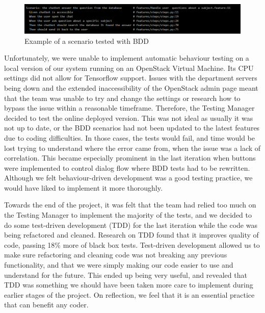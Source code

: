 \documentclass{l3proj}
\begin{document}
\begin{figure}[h!]
  \includegraphics[width=\linewidth]{figures/BDD.PNG}
  \caption{Example of a scenario tested with BDD}
\end{figure}

Unfortunately, we were unable to implement automatic behaviour testing on a local version of our system running on an OpenStack Virtual Machine. Its CPU settings did not allow for Tensorflow support. Issues with the department servers being down and the extended inaccessibility of the OpenStack admin page meant that the team was unable to try and change the settings or research how to bypass the issue within a reasonable timeframe. Therefore, the Testing Manager decided to test the online deployed version. This was not ideal as usually it was not up to date, or the BDD scenarios had not been updated to the latest features due to coding difficulties. In those cases, the tests would fail, and time would be lost trying to understand where the error came from, when the issue was a lack of correlation. This became especially prominent in the last iteration when buttons were implemented to control dialog flow where BDD tests had to be rewritten. Although we felt behaviour-driven development was a good testing practice, we would have liked to implement it more thoroughly.

Towards the end of the project, it was felt that the team had relied too much on the Testing Manager to implement the majority of the tests, and we decided to do some test-driven development (TDD) for the last iteration while the code was being refactored and cleaned. Research on TDD found that it improves quality of code, passing 18\% more of black box tests\cite{tdd:George}. Test-driven development allowed us to make sure refactoring and cleaning code was not breaking any previous functionality, and that we were simply making our code easier to use and understand for the future. This ended up being very useful, and revealed that TDD was something we should have been taken more care to implement during earlier stages of the project. On reflection, we feel that it is an essential practice that can benefit any coder.
\end{document}
